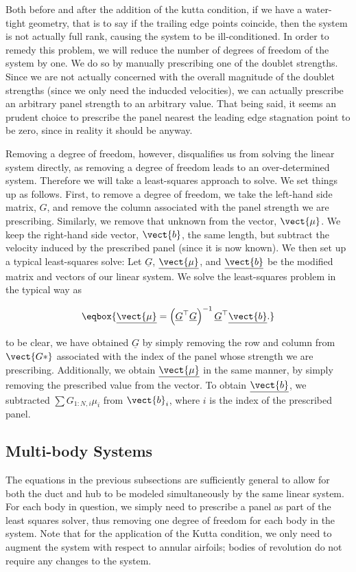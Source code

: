 Both before and after the addition of the kutta condition, if we have a water-tight geometry, that is to say if the trailing edge points coincide, then the system is not actually full rank, causing the system to be ill-conditioned.
In order to remedy this problem, we will reduce the number of degrees of freedom of the system by one.
We do so by manually prescribing one of the doublet strengths.
Since we are not actually concerned with the overall magnitude of the doublet strengths (since we only need the inducded velocities), we can actually prescribe an arbitrary panel strength to an arbitrary value.
That being said, it seems an prudent choice to prescribe the panel nearest the leading edge stagnation point to be zero, since in reality it should be anyway.

Removing a degree of freedom, however, disqualifies us from solving the linear system directly, as removing a degree of freedom leads to an over-determined system.
Therefore we will take a least-squares approach to solve.
We set things up as follows.
First, to remove a degree of freedom, we take the left-hand side matrix, \(G\), and remove the column associated with the panel strength we are prescribing.
Similarly, we remove that unknown from the vector, \(\vect{\mu}\).
We keep the right-hand side vector, \(\vect{b}\), the same length, but subtract the velocity induced by the prescribed panel (since it is now known).
We then set up a typical least-squares solve: Let \(\underline{G}\), \(\underline{\vect{\mu}}\), and \(\underline{\vect{b}}\) be the modified matrix and vectors of our linear system.
We solve the least-squares problem in the typical way as

\begin{equation}
    \eqbox{
    \underline{\vect{\mu}} = \left( \underline{G}^\top  \underline{G} \right)^{-1} \underline{G}^\top  \underline{\vect{b}}.
}
\end{equation}

\where to be clear, we have obtained \(\underline{G}\) by simply removing the row and column from \(\vect{G*}\) associated with the index of the panel whose strength we are prescribing.
Additionally, we obtain  \(\underline{\vect{\mu}}\) in the same manner, by simply removing the prescribed value from the vector.
To obtain \(\underline{\vect{b}}\), we subtracted \(\sum G_{1:N,i} \mu_i\) from \(\vect{b}_i\), where \(i\) is the index of the prescribed panel.

\subsection{Multi-body Systems}
\label{ssec:ducthubsystem}

The equations in the previous subsections are sufficiently general to allow for both the duct and hub to be modeled simultaneously by the same linear system.
For each body in question, we simply need to prescribe a panel as part of the least squares solver, thus removing one degree of freedom for each body in the system.
Note that for the application of the Kutta condition, we only need to augment the system with respect to annular airfoils; bodies of revolution do not require any changes to the system.
